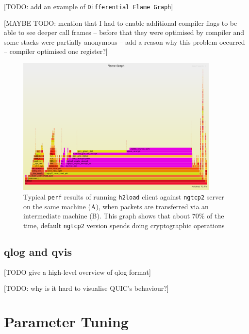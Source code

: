 \documentclass[12pt,a4paper,twoside,openright]{report}
\begin{document}
[TODO: add an example of \texttt{Differential Flame Graph}]





[MAYBE TODO: mention that I had to enable additional compiler flags to be able to see deeper call frames -- before that they were optimised by compiler and some stacks were partially anonymous  -- add a reason why this problem occurred -- compiler optimised one register?]

    \begin{figure}[ht]
    \centering
    \includegraphics[width=0.9\textwidth]{figs/perf_results_of_h2load.png}
    \caption[Typical \texttt{perf} results of running \texttt{h2load} client against \texttt{ngtcp2} server on the same machine (A), when packets are transferred via an intermediate machine (B)]{Typical \texttt{perf} results of running \texttt{h2load} client against \texttt{ngtcp2} server on the same machine (A), when packets are transferred via an intermediate machine (B). This graph shows that about 70\% of the time, default \texttt{ngtcp2} version spends doing cryptographic operations} 
    \label{fig:perf_results_of_h2load}
    \end{figure}
    
\subsection{qlog and qvis}
[TODO give a high-level overview of qlog format]

[TODO: why is it hard to visualise QUIC's behaviour?]



\section{Parameter Tuning}
\end{document}
